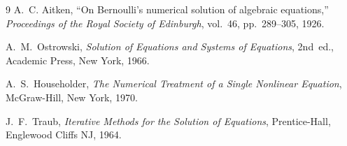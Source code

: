\documentclass[11pt,a4paper]{article}
\theoremstyle{definition}
\begin{document}
\begin{thebibliography}{9}
A.~C. Aitken,
``On Bernoulli's numerical solution of algebraic equations,''
\textit{Proceedings of the Royal Society of Edinburgh}, vol.~46, pp.~289--305, 1926.

A.~M.~Ostrowski,
\textit{Solution of Equations and Systems of Equations},
2nd~ed., Academic Press, New York, 1966.

A.~S.~Householder,
\textit{The Numerical Treatment of a Single Nonlinear Equation},
McGraw-Hill, New York, 1970.

J.~F.~Traub,
\textit{Iterative Methods for the Solution of Equations},
Prentice-Hall, Englewood Cliffs NJ, 1964.

\end{thebibliography}
\end{document}
